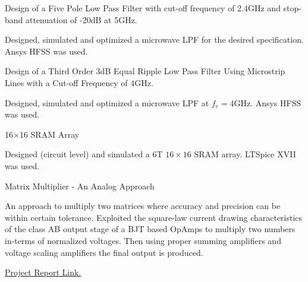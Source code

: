 \begin{cventries}

  \cventry
    {Design of a Five Pole Low Pass Filter with cut-off frequency of 2.4GHz and stop-band attenuation of -20dB at 5GHz.} %
    {} %
    {} %
    {} %
    {
      \begin{cvitems} %
        \item {Designed, simulated and optimized a microwave LPF for the desired specification. Ansys HFSS was used.}
      \end{cvitems}
    }

  \cventry
    {Design of a Third Order 3dB Equal Ripple Low Pass Filter Using Microstrip Lines with a Cut-off Frequency of 4GHz.} %
    {} %
    {} %
    {} %
    {
      \begin{cvitems} %
        \item {Designed, simulated and optimized a microwave LPF at $f_c=4$GHz. Ansys HFSS was used.}
      \end{cvitems}
    }


  \cventry
    {16$\times$16 SRAM Array} %
    {} %
    {} %
    {} %
    {
      \begin{cvitems} %
        \item {Designed (circuit level) and simulated a 6T $16\times16$ SRAM array. LTSpice XVII was used.}
      \end{cvitems}
    }


  \cventry
    {Matrix Multiplier - An Analog Approach} %
    {} %
    {} %
    {} %
    {
      \begin{cvitems} %
        \item {An approach to multiply two matrices where accuracy and precision can be within certain tolerance. Exploited the square-law current drawing characteristics of the class AB output stage of a BJT based OpAmps to multiply two numbers in-terms of normalized voltages. Then using proper summing amplifiers and voltage scaling amplifiers the final output is produced.}
        \item {\href{https://github.com/DhimanSarkar/BTech-Major-Project/raw/master/BTech Major Project/report.pdf}{Project Report Link.}}
      \end{cvitems}
    }


\end{cventries}
